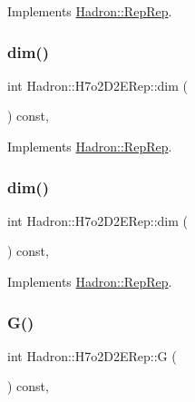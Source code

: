 Implements \mbox{\hyperlink{structHadron_1_1RepRep_a92c8802e5ed7afd7da43ccfd5b7cd92b}{Hadron\+::\+Rep\+Rep}}.

\mbox{\label{structHadron_1_1H7o2D2ERep_a0d67fbc1ec1b377b33be3e38873e0732}} 
\subsubsection{\texorpdfstring{dim()}{dim()}\hspace{0.1cm}{\footnotesize\ttfamily [2/3]}}
{\footnotesize\ttfamily int Hadron\+::\+H7o2\+D2\+E\+Rep\+::dim (\begin{DoxyParamCaption}{ }\end{DoxyParamCaption}) const\hspace{0.3cm}{\ttfamily [inline]}, {\ttfamily [virtual]}}



Implements \mbox{\hyperlink{structHadron_1_1RepRep_a92c8802e5ed7afd7da43ccfd5b7cd92b}{Hadron\+::\+Rep\+Rep}}.

\mbox{\label{structHadron_1_1H7o2D2ERep_a0d67fbc1ec1b377b33be3e38873e0732}} 
\subsubsection{\texorpdfstring{dim()}{dim()}\hspace{0.1cm}{\footnotesize\ttfamily [3/3]}}
{\footnotesize\ttfamily int Hadron\+::\+H7o2\+D2\+E\+Rep\+::dim (\begin{DoxyParamCaption}{ }\end{DoxyParamCaption}) const\hspace{0.3cm}{\ttfamily [inline]}, {\ttfamily [virtual]}}



Implements \mbox{\hyperlink{structHadron_1_1RepRep_a92c8802e5ed7afd7da43ccfd5b7cd92b}{Hadron\+::\+Rep\+Rep}}.

\mbox{\label{structHadron_1_1H7o2D2ERep_a6766559158a6095cb73ce82fcfd2de2e}} 
\subsubsection{\texorpdfstring{G()}{G()}\hspace{0.1cm}{\footnotesize\ttfamily [1/2]}}
{\footnotesize\ttfamily int Hadron\+::\+H7o2\+D2\+E\+Rep\+::G (\begin{DoxyParamCaption}{ }\end{DoxyParamCaption}) const\hspace{0.3cm}{\ttfamily [inline]}, {\ttfamily [virtual]}}

